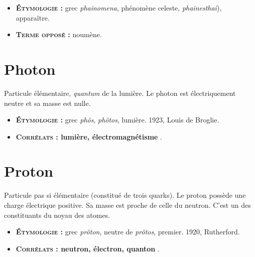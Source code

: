 {\footnotesize
\begin{itemize}[leftmargin=1cm, label=, itemsep=1pt]
\item {\bf \textsc{Étymologie} :} grec {\it phainomena}, phénomène celeste, {\it phainesthai}), apparaître.
\item {\bf \textsc{Terme opposé} :} noumène.
\end{itemize}
}

\section{Photon}
Particule élémentaire, {\it quantum} de la lumière.
Le photon est électriquement neutre et sa masse est nulle.
{\footnotesize
\begin{itemize}[leftmargin=1cm, label=, itemsep=1pt]
\item {\bf \textsc{Étymologie} :} grec {\it phôs}, {\it phôtos}, lumière. 1923, Louis de Broglie.
\item {\bf \textsc{Corrélats} : lumière, électromagnétisme} .
\end{itemize}
}

\section{Proton}
Particule pas si élémentaire (constitué de trois quarks).
Le proton possède une charge électrique positive.
Sa masse est proche de celle du neutron.
C'est un des constituants du noyau des atomes.
{\footnotesize
\begin{itemize}[leftmargin=1cm, label=, itemsep=1pt]
\item {\bf \textsc{Étymologie} :} grec {\it prôton}, neutre de {\it prôtos}, premier. 1920, Rutherford.
\item {\bf \textsc{Corrélats} : neutron, électron, quanton} .
\end{itemize}
}
